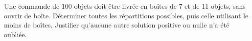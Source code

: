 \documentclass[11pt]{article}
\begin{document}
Une commande de 100 objets doit être livrée en boîtes de 7 et de 11 objets, sans ouvrir de boîte. Déterminer toutes les répartitions possibles, puis celle utilisant le moins de boîtes. Justifier qu’aucune autre solution positive ou nulle n’a été oubliée.\par
\vspace{5pt}
\end{document}
